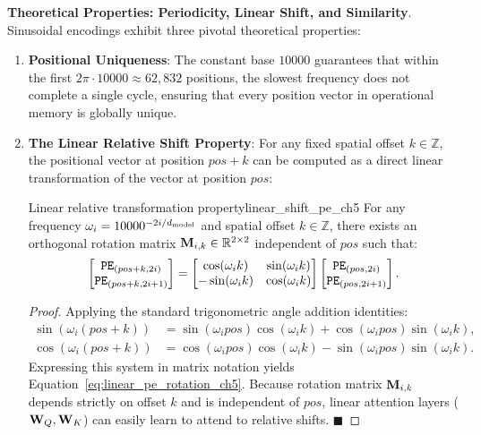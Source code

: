 \documentclass[../../../main.tex]{subfiles}
\begin{document}
\noindent\textbf{Theoretical Properties: Periodicity, Linear Shift, and Similarity}.\newline
Sinusoidal encodings exhibit three pivotal theoretical properties:
\begin{enumerate}
    \item \textbf{Positional Uniqueness}: The constant base $10000$ guarantees that within the first $2\pi \cdot 10000 \approx 62{,}832$ positions, the slowest frequency does not complete a single cycle, ensuring that every position vector in operational memory is globally unique.
    \item \textbf{The Linear Relative Shift Property}: For any fixed spatial offset $k \in \mathbb{Z}$, the positional vector at position $pos + k$ can be computed as a direct linear transformation of the vector at position $pos$:
    \begin{theorem}{Linear relative transformation property}{linear_shift_pe_ch5}
    For any frequency $\omega_i = 10000^{-2i/d_{\text{model}}}$ and spatial offset $k \in \mathbb{Z}$, there exists an orthogonal rotation matrix $\mathbf{M}_{i, k} \in \mathbb{R}^{2 \times 2}$ independent of $pos$ such that:
    \begin{equation}
    \label{eq:linear_pe_rotation_ch5}
    \begin{bmatrix} \text{\texttt{PE}}_{(pos+k, 2i)} \\ \text{\texttt{PE}}_{(pos+k, 2i+1)} \end{bmatrix} = \begin{bmatrix} \cos(\omega_i k) & \sin(\omega_i k) \\ -\sin(\omega_i k) & \cos(\omega_i k) \end{bmatrix} \begin{bmatrix} \text{\texttt{PE}}_{(pos, 2i)} \\ \text{\texttt{PE}}_{(pos, 2i+1)} \end{bmatrix}.
    \end{equation}
    \end{theorem}
    \begin{proof}
    Applying the standard trigonometric angle addition identities:
    \begin{align}
    \sin(\omega_i(pos + k)) &= \sin(\omega_i pos)\cos(\omega_i k) + \cos(\omega_i pos)\sin(\omega_i k), \\
    \cos(\omega_i(pos + k)) &= \cos(\omega_i pos)\cos(\omega_i k) - \sin(\omega_i pos)\sin(\omega_i k).
    \end{align}
    Expressing this system in matrix notation yields Equation~\eqref{eq:linear_pe_rotation_ch5}. Because rotation matrix $\mathbf{M}_{i, k}$ depends strictly on offset $k$ and is independent of $pos$, linear attention layers ($\mathbf{W}_Q, \mathbf{W}_K$) can easily learn to attend to relative shifts. $\blacksquare$

\end{proof}
\end{enumerate}
\end{document}
